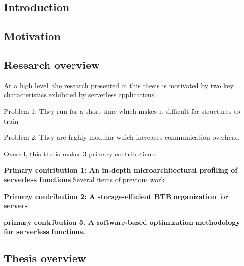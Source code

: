 \documentclass[../main.tex]{subfiles}
\begin{document}
\ifx\chapincluded\undefined
  \begin{refsection}
 \fi


\chapter{Introduction}

\section{Motivation}


\section{Research overview}

At a high level, the research presented in this thesis is motivated by two key characteristics exhibited by serverless applications

Problem 1: They run for a short time which makes it difficult for structures to train

Problem 2: They are highly modular which increases communication overhead

Overall, this thesis makes 3 primary contributions:

\vspace*{0.5cm}

\noindent
\textbf{Primary contribution 1: An in-depth microarchitectural profiling of serverless functions}
Several items of previous work 

\vspace*{0.5cm}

\noindent
\textbf{Primary contribution 2: A storage-efficient BTB organization for servers}

\vspace*{0.5cm}

\noindent
\textbf{primary contribution 3: A software-based optimization methodology for serverless functions.}

\section{Thesis overview}


\ifx\chapincluded\undefined
  \printbibliography
  \end{refsection}
 \fi
\end{document}
